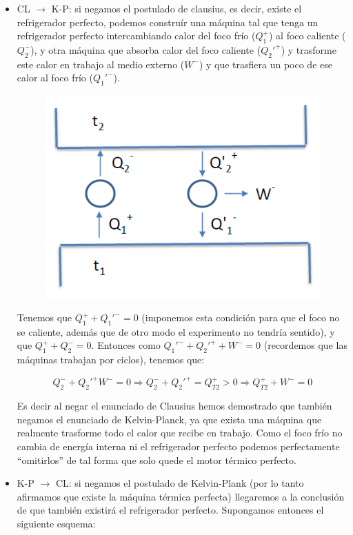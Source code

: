 \documentclass[12pt,a4paper]{article}
\begin{document}
\begin{itemize}
\item CL $\longrightarrow$ K-P: si negamos el postulado de clausius, es decir, existe el refrigerador perfecto, podemos construír una máquina tal que tenga un refrigerador perfecto intercambiando calor del foco frío ($Q_1^+$) al foco caliente ($Q_2^-$), y otra máquina que absorba calor del foco caliente ($Q_2 '^+$) y trasforme este calor en trabajo al medio externo ($W^-$) y que trasfiera un poco de ese calor al foco frío ($Q_1'^-$). 

\begin{figure}[h!]
\centering \includegraphics[scale=0.5]{CL-KP.png}
\end{figure}

Tenemos que $Q_1^+ + Q_1'^- = 0$ (imponemos esta condición para que el foco no se caliente, además que de otro modo el experimento no tendría sentido), y que $Q_1^+ + Q_2^-=0$. Entonces como $Q_1'^- + Q_2'^+ + W^- = 0$ (recordemos que las máquinas trabajan por ciclos), tenemos que:

$$ Q_2^- + Q_2'^ + W^- = 0 \Longrightarrow Q_2^- + Q_2'^+ = Q_{T2}^+ > 0 \Longrightarrow Q_{T2}^+  + W^- = 0  $$

Es decir al negar el enunciado de Clausius hemos demostrado que también negamos el enunciado de Kelvin-Planck, ya que exista una máquina que realmente trasforme todo el calor que recibe en trabajo.  Como el foco frío no cambia de energía interna ni el refrigerador perfecto podemos perfectamente ``omitirlos'' de tal forma que solo quede el motor térmico perfecto. 


\item K-P $\longrightarrow$ CL: si negamos el postulado de Kelvin-Plank (por lo tanto afirmamos que existe la máquina térmica perfecta) llegaremos a la conclusión de que también existirá el refrigerador perfecto. Supongamos entonces el siguiente esquema: 



\end{itemize}
\end{document}
